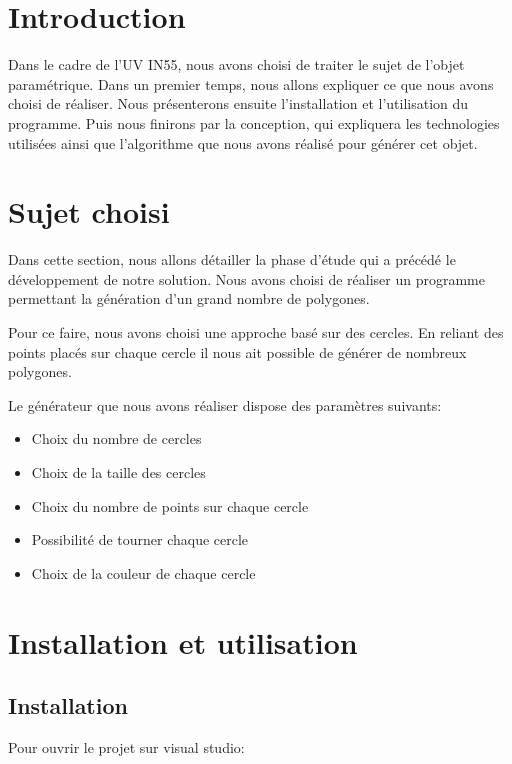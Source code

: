 \documentclass[article, backcover, french, nodocumentinfo]{upmethodology-document}
\begin{document}
	\thispagestyle{empty}
	\upmdocumentsummary{}
	\upmdocumentauthors{}
	\upmdocumentinformedpeople{}
	\upmpublicationpage{}
	\newpage{}
	\tableofcontents{}
	\newpage{}
	\section{Introduction}
		Dans le cadre de l'UV IN55, nous avons choisi de traiter le sujet de l'objet paramétrique.
		Dans un premier temps, nous allons expliquer ce que nous avons choisi de réaliser.
		Nous présenterons ensuite l'installation et l'utilisation du programme.
		Puis nous finirons par la conception, qui expliquera les technologies utilisées ainsi que l'algorithme que nous avons réalisé pour générer cet objet.

	\section{Sujet choisi}
		Dans cette section, nous allons détailler la phase d'étude qui a précédé le développement de notre solution.
		Nous avons choisi de réaliser un programme permettant la génération d'un grand nombre de polygones.
		
		Pour ce faire, nous avons choisi une approche basé sur des cercles.
		En reliant des points placés sur chaque cercle il nous ait possible de générer de nombreux polygones.

		Le générateur que nous avons réaliser dispose des paramètres suivants:
		\begin{itemize}
			\item Choix du nombre de cercles
			\item Choix de la taille des cercles
			\item Choix du nombre de points sur chaque cercle
			\item Possibilité de tourner chaque cercle
			\item Choix de la couleur de chaque cercle
		\end{itemize}
	\section{Installation et utilisation}
		\subsection{Installation}
		Pour ouvrir le projet sur visual studio:
\end{document}
